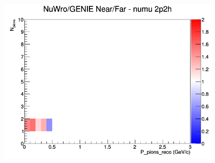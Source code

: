 \documentclass[12pt]{article}
\begin{document}
\begin{figure}[h]
\endminipage
{}
\includegraphics[width=\linewidth]{eff_N_P/GAr/pions/ratios/2p2h_NuWro_GENIE_numu_NF_N_P.png}
\endminipage
\newline
\end{figure}
\clearpage
\end{document}
